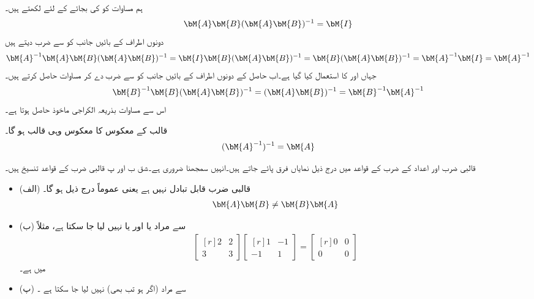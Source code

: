 ہم مساوات  کو  کی بجائے  کے لئے لکھتے ہیں۔
\begin{align*}
\bM{A}\bM{B}(\bM{A}\bM{B})^{-1}=\bM{I}
\end{align*}
دونوں اطراف کے بائیں جانب کو  سے ضرب دیتے ہیں
\begin{align*}
\bM{A}^{-1}\bM{A}\bM{B}(\bM{A}\bM{B})^{-1}=\bM{I}\bM{B}(\bM{A}\bM{B})^{-1}=\bM{B}(\bM{A}\bM{B})^{-1}=\bM{A}^{-1}\bM{I}=\bM{A}^{-1}
\end{align*}
جہاں   اور  کا استعمال کیا گیا ہے۔اب حاصل   کے دونوں اطراف کے بائیں جانب کو  سے ضرب دے کر مساوات  حاصل کرتے ہیں۔
\begin{align*}
\bM{B}^{-1}\bM{B}(\bM{A}\bM{B})^{-1}=(\bM{A}\bM{B})^{-1}=\bM{B}^{-1}\bM{A}^{-1}
\end{align*}
اس سے مساوات  بذریعہ  الکراجی ماخوذ حاصل ہوتا ہے۔

قالب  کے معکوس کا معکوس وہی قالب  ہو گا۔
\begin{align}
(\bM{A}^{-1})^{-1}=\bM{A}
\end{align}

قالبی ضرب اور اعداد کے ضرب کے قواعد میں درج ذیل نمایاں فرق پائے جاتے ہیں۔انہیں سمجھنا ضروری ہے۔شق ب اور پ قالبی ضرب کے قواعد تنسیخ ہیں۔

\begin{itemize}
\item{(الف)}
قالبی ضرب قابل تبادل نہیں ہے یعنی عموماً درج ذیل ہو گا۔
\begin{align}
\bM{A}\bM{B} \ne \bM{B}\bM{A}
\end{align}
\item{(ب)}
 سے مراد  یا  اور یا  نہیں لیا جا سکتا ہے، مثلاً
\begin{align*}
\begin{bmatrix*}[r] 2&2\\3&3 \end{bmatrix*}\begin{bmatrix*}[r] 1&-1\\-1&1 \end{bmatrix*}=\begin{bmatrix*}[r] 0&0\\0&0  \end{bmatrix*}
\end{align*}
میں  ہے۔
\item{(پ)}
 سے مراد  (اگر  ہو تب بھی) نہیں لیا جا سکتا ہے ۔
\end{itemize}


